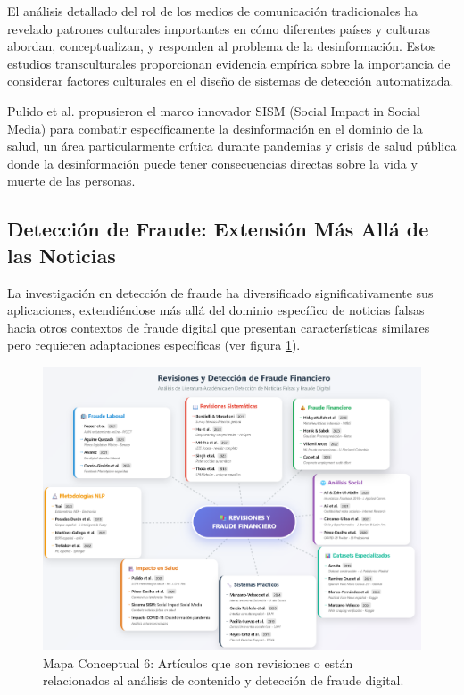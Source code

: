 El análisis detallado del rol de los medios de comunicación tradicionales \cite{carcamo2021fake, perez2020fake} ha revelado patrones culturales importantes en cómo diferentes países y culturas abordan, conceptualizan, y responden al problema de la desinformación. Estos estudios transculturales proporcionan evidencia empírica sobre la importancia de considerar factores culturales en el diseño de sistemas de detección automatizada.

Pulido et al. \cite{pulido2020new} propusieron el marco innovador SISM (Social Impact in Social Media) para combatir específicamente la desinformación en el dominio de la salud, un área particularmente crítica durante pandemias y crisis de salud pública donde la desinformación puede tener consecuencias directas sobre la vida y muerte de las personas.

\subsection{Detección de Fraude: Extensión Más Allá de las Noticias}

La investigación en detección de fraude ha diversificado significativamente sus aplicaciones, extendiéndose más allá del dominio específico de noticias falsas hacia otros contextos de fraude digital que presentan características similares pero requieren adaptaciones específicas (ver figura \ref{fig:mapa_conceptual_6}).

\begin{figure}[h!]
    \centering
    \includegraphics[width=\textwidth]{Imagenes/mapaConceptual6.png}
    \caption{Mapa Conceptual 6: Artículos que son revisiones o están relacionados al análisis de contenido y detección de fraude digital.}
    \label{fig:mapa_conceptual_6}
\end{figure}

